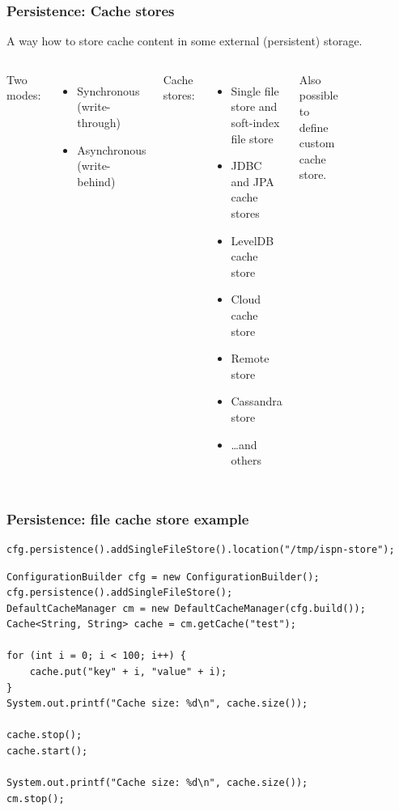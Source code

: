 \documentclass[10pt,utf8]{beamer}
\begin{document}
\begin{frame}
	\frametitle{Persistence: Cache stores}
	A way how to store cache content in some external (persistent) storage.\\
	\begin{columns}
	 {
		Two modes:
		\begin{itemize}
			\item Synchronous (write-through)
			\item Asynchronous (write-behind)
		\end{itemize}
	}
	 {
		Cache stores:
		\begin{itemize}
			\item Single file store and soft-index file store
			\item JDBC and JPA cache stores
			\item LevelDB cache store
			\item Cloud cache store
			\item Remote store
			\item Cassandra store
			\item \dots and others
		\end{itemize}
		Also possible to define custom cache store.
	}
		\begin{figure}
			\includegraphics[width=3cm]{./img/cache_store.eps}
		\end{figure}
	\end{columns}
\end{frame}

\begin{frame}[fragile]
	\frametitle{Persistence: file cache store example}
	\begin{lstlisting}[style=Java]
cfg.persistence().addSingleFileStore().location("/tmp/ispn-store");
	\end{lstlisting}
	\begin{lstlisting}[style=Java]
ConfigurationBuilder cfg = new ConfigurationBuilder();
cfg.persistence().addSingleFileStore();
DefaultCacheManager cm = new DefaultCacheManager(cfg.build());
Cache<String, String> cache = cm.getCache("test");
        
for (int i = 0; i < 100; i++) {
    cache.put("key" + i, "value" + i);
}
System.out.printf("Cache size: %d\n", cache.size());
        
cache.stop();
cache.start();
        
System.out.printf("Cache size: %d\n", cache.size());
cm.stop();  
	\end{lstlisting}
\end{frame}
\end{document}
